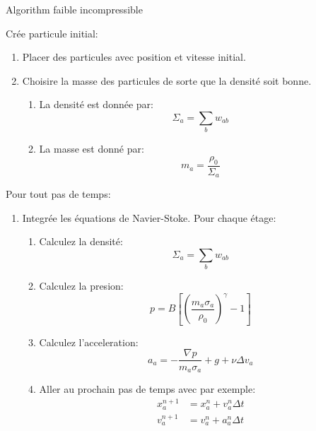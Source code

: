 \begin{frame}[shrink]{Algorithm faible incompressible}
\begin{block}{Crée particule initial:}
	\begin{enumerate}
		\item Placer des particules avec position et vitesse initial.
		\item Choisire la masse des particules de sorte que la densité soit bonne.
		\begin{enumerate}
			\item La densité est donnée par:
			\begin{equation*}
			\Sigma_{a}=\sum_{b}w_{ab}
			\end{equation*}
			\item La masse est donné par:
			\begin{equation*}
			m_a=\frac{\rho_{0}}{\Sigma_{a}}
			\end{equation*}
		\end{enumerate}
	\end{enumerate}
\end{block}
\begin{block}{Pour tout pas de temps:}
	\begin{enumerate}
		\item Integrée les équations de Navier-Stoke. Pour chaque étage:
		\begin{enumerate}
			\item Calculez la densité:
			\begin{equation*}
			\Sigma_{a}=\sum_{b}w_{ab}
			\end{equation*}
			\item Calculez la presion:
			\begin{equation*}
			p=B \left[\left(\frac{m_{a}\sigma_{a}}{\rho_{0}}\right)^{\gamma}-1\right]
			\end{equation*}
			\item Calculez l'acceleration:
			\begin{equation*}
			a_a=-\frac{\nabla p}{m_{a}\sigma_{a}}+g+\nu \Delta v_{a}
			\end{equation*}
			\item Aller au prochain pas de temps avec par exemple:
			\begin{align*}
			x^{n+1}_{a}&=x^{n}_{a}+v^{n}_a\Delta t\\
			v^{n+1}_{a}&=v^{n}_{a}+a^{n}_{a}\Delta t
			\end{align*}
		\end{enumerate}
	\end{enumerate}
\end{block}
\end{frame}
 
